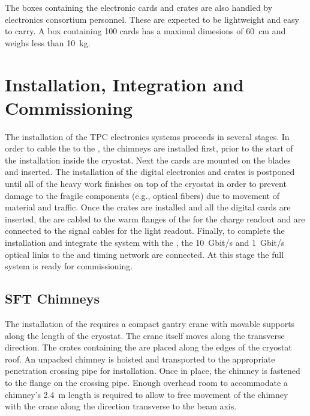 The boxes containing the electronic cards and  crates are also handled by \dual electronics consortium personnel. These are expected to be lightweight and %
easy to carry. A box containing \num{100}  cards has a maximal dimesions of \SI{60}{\cm} and weighs less than \SI{10}{\kg}. 

\section{Installation, Integration and Commissioning}
\label{sec:fddp-tpc-elec-install}

The installation of the TPC electronics systems proceeds in several stages. In order to cable the  to the , %
the chimneys 
are installed first, prior to the start of the  installation inside the cryostat. %
Next the  cards %
are mounted on the blades and inserted. The installation of the digital electronics and  crates %
is postponed until all of the heavy work finishes on top of the cryostat in order to prevent %
damage to the fragile components (e.g., optical fibers)  %
due to movement of material and traffic. %
Once the  crates are installed and all the digital cards are inserted, the %
 are cabled to the warm flanges of the  for the charge readout and are connected to the  signal cables for the light readout. Finally, to complete the installation and integrate the system with the , the \SI{10}{Gbit/s} and \SI{1}{Gbit/s} optical links to the  and  timing network are connected. At this stage the full system is ready for commissioning. 


\subsection{SFT Chimneys}
\label{sec:fddp-tpc-elec-install-sft}

The installation of the  requires a compact gantry crane with %
movable supports along the length of the cryostat. The crane itself moves along the transverse direction. The crates containing the  are placed along the edges of the cryostat roof. An unpacked chimney is hoisted and transported to %
the appropriate penetration crossing pipe for installation. Once in place, the chimney is fastened to the flange on the crossing pipe. %
Enough overhead room to accommodate a chimney's \SI{2.4}{m} length is required
to allow to free movement of the chimney with the crane along the direction transverse to the beam axis. 

